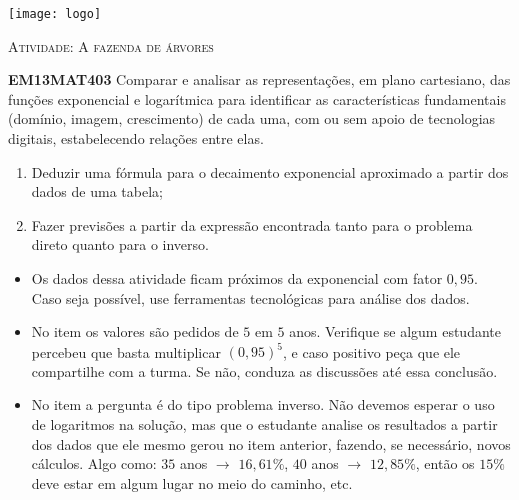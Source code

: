 \documentclass[10 pt,usenames,dvipsnames, oneside]{article}
\begin{document}
\begin{center}
  \begin{minipage}[l]{3cm}
\texttt{[image: logo]}    
\end{minipage}\hfill
\begin{minipage}[r]{.8\textwidth}
 {\Large \scshape Atividade: A fazenda de árvores}  
\end{minipage}
\end{center}
\vspace{.2cm}

\ifdefined\prof
\begin{objetivos}
\item \textbf{EM13MAT403} Comparar e analisar as representações, em plano cartesiano, das funções exponencial e logarítmica para identificar as características fundamentais (domínio, imagem, crescimento) de cada uma, com ou sem apoio de tecnologias digitais, estabelecendo relações entre elas.
\end{objetivos}

\begin{goals}
\begin{enumerate}
\item Deduzir uma fórmula para o decaimento exponencial aproximado a partir dos dados de uma tabela;
\item Fazer previsões a partir da expressão encontrada tanto para o problema direto quanto para o inverso.
\end{enumerate}

\tcblower

\begin{itemize}
	\item Os dados dessa atividade ficam próximos da exponencial com fator $0{,}95$. Caso seja possível, use ferramentas tecnológicas para análise dos dados.
	\item No item  os valores são pedidos de $5$ em $5$ anos. Verifique se algum estudante percebeu que basta multiplicar $(0,95)^{5}$, e caso positivo peça que ele compartilhe com a turma. Se não, conduza as discussões até essa conclusão.
	\item No item  a pergunta é do tipo problema inverso. Não devemos esperar o uso de logaritmos na solução, mas que o estudante analise os resultados a partir dos dados que ele mesmo gerou no item anterior, fazendo, se necessário, novos cálculos. Algo como: $35$ anos $\rightarrow$ $16,61\%$, $40$ anos $\rightarrow$ $12,85\%$, então os $15\%$ deve estar em algum lugar no meio do caminho, etc.
\end{itemize}
\end{goals}
\end{document}
